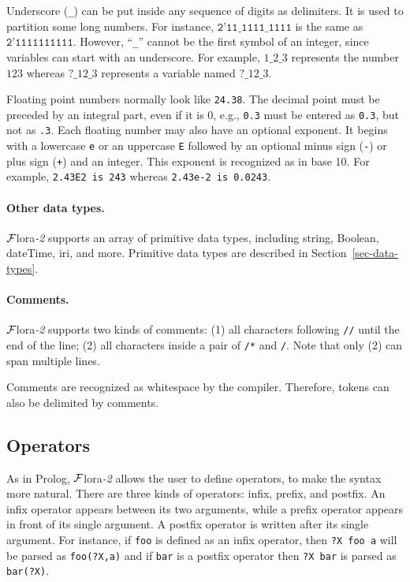 \documentclass[11pt]{article}
\newcommand{\FLORA}{{\mbox{\sc ${\cal F}${lora}\rm\emph{-2}}}\xspace}
\begin{document}
Underscore (\texttt{\_}) can be put inside any sequence of digits as
delimiters. It is used to partition some long numbers. For instance,
$\texttt{2'11\_1111\_1111}$ is the same as $\texttt{2'1111111111}$.
However, ``\texttt{\_}'' cannot be the first symbol of an integer, since
variables can start with an underscore. For example, $1\_2\_3$ represents
the number $123$ whereas $?\_12\_3$ represents a variable named $?\_12\_3$.

Floating point numbers normally look like {\tt 24.38}. The decimal point
must be preceded by an integral part, even if it is 0, e.g., {\tt 0.3}
must be entered as {\tt 0.3}, but not as {\tt .3}. Each floating
number may also have an optional exponent. It begins with a lowercase
{\tt e} or an uppercase {\tt E} followed by an optional minus sign
({\tt -}) or plus sign ({\tt +}) and an integer. This exponent is
recognized as in base 10. For example,
\mbox{\tt 2.43E2 is 243} whereas
\mbox{\tt 2.43e-2 is 0.0243}.

\paragraph{Other data types.}
\FLORA supports an array of primitive data types, including string, Boolean,
dateTime, iri, and more. Primitive data types are described in
Section~\ref{sec-data-types}.

\paragraph{Comments.}

%
\FLORA supports two kinds of comments: (1) all characters following
{\tt //} until the end of the line; (2) all characters inside a pair of
{\tt /*} and {\tt */}. Note that only (2) can span multiple lines.

Comments are recognized as whitespace by the compiler.  Therefore,
tokens can also be delimited by comments.


\subsection{Operators}


As in Prolog, \FLORA allows the user to define operators, to make the
syntax more natural.
There are three kinds of operators: infix,
prefix, and postfix. An infix operator appears between its two arguments,
while a prefix operator appears in front of its single argument. A postfix
operator is written
after its single argument. For instance, if {\tt foo} is defined as an
infix operator, then {\tt ?X foo a} will be parsed as {\tt foo(?X,a)} and if
{\tt bar} is a postfix operator then {\tt ?X bar} is parsed as {\tt bar(?X)}. 
\end{document}
